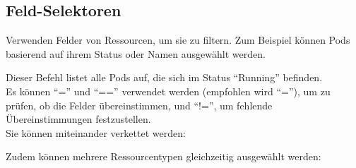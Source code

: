 \subsection{Feld-Selektoren}
Verwenden Felder von Ressourcen, um sie zu filtern. Zum Beispiel können Pods basierend auf ihrem Status oder Namen ausgewählt werden.

Dieser Befehl listet alle Pods auf, die sich im Status \enquote{Running} befinden.\\
Es können \enquote{=} und \enquote{==} verwendet werden (empfohlen wird \enquote{=}), um zu prüfen, ob die Felder übereinstimmen, und \enquote{!=}, um fehlende Übereinstimmungen festzustellen.\\
Sie können miteinander verkettet werden:

Zudem können mehrere Ressourcentypen gleichzeitig ausgewählt werden:

